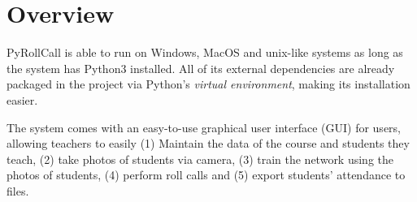 \section{Overview}
PyRollCall is able to run on Windows, MacOS and unix-like systems as long as
the system has Python3 installed. All of its external dependencies are already packaged
in the project via Python's \emph{virtual environment}, making its installation easier.

The system comes with an easy-to-use graphical user interface (GUI) for users, allowing teachers to easily
(1) Maintain the data of the course and students they teach,
(2) take photos of students via camera,
(3) train the network using the photos of students,
(4) perform roll calls and
(5) export students' attendance to files.
